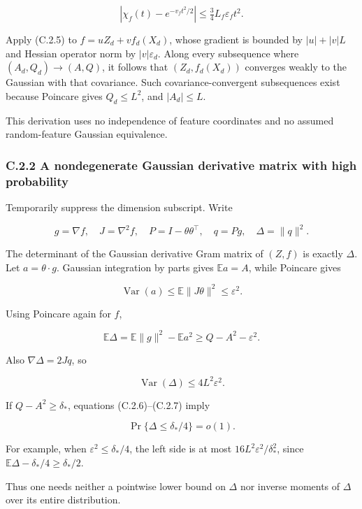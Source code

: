 \documentclass[
  11pt,
  a4paper,
]{article}
\begin{document}
\[
|\chi_f(t)-e^{-v_ft^2/2}|
 \le\tfrac34 L_f\varepsilon_f t^2.
\tag{C.2.5}
\]

Apply (C.2.5) to \(f=uZ_d+v f_d(X_d)\), whose gradient is bounded by
\(|u|+|v|L\) and Hessian operator norm by \(|v|\varepsilon_d\). Along
every subsequence where \((A_d,Q_d)\to(A,Q)\), it follows that
\((Z_d,f_d(X_d))\) converges weakly to the Gaussian with that
covariance. Such covariance-convergent subsequences exist because
Poincare gives \(Q_d\le L^2\), and \(|A_d|\le L\).

This derivation uses no independence of feature coordinates and no
assumed random-feature Gaussian equivalence.

\hypertarget{c.2.2-a-nondegenerate-gaussian-derivative-matrix-with-high-probability}{%
\subsubsection{C.2.2 A nondegenerate Gaussian derivative matrix with
high
probability}\label{c.2.2-a-nondegenerate-gaussian-derivative-matrix-with-high-probability}}

Temporarily suppress the dimension subscript. Write

\[
g=\nabla f,\quad J=\nabla^2f,\quad
P=I-\theta\theta^\top,\quad q=Pg,\quad
\Delta=\|q\|^2.
\]

The determinant of the Gaussian derivative Gram matrix of \((Z,f)\) is
exactly \(\Delta\). Let \(a=\theta\cdot g\). Gaussian integration by
parts gives \(\mathbb Ea=A\), while Poincare gives

\[
\operatorname{Var}(a)\le\mathbb E\|J\theta\|^2
 \le\varepsilon^2.
\]

Using Poincare again for \(f\),

\[
\mathbb E\Delta
 =\mathbb E\|g\|^2-\mathbb Ea^2
 \ge Q-A^2-\varepsilon^2.
\tag{C.2.6}
\]

Also \(\nabla\Delta=2Jq\), so

\[
\operatorname{Var}(\Delta)
 \le 4L^2\varepsilon^2.
\tag{C.2.7}
\]

If \(Q-A^2\ge\delta_*\), equations (C.2.6)--(C.2.7) imply

\[
\Pr\{\Delta\le\delta_*/4\}=o(1).
\tag{C.2.8}
\]

For example, when \(\varepsilon^2\le\delta_*/4\), the left side is at
most \(16L^2\varepsilon^2/\delta_*^2\), since
\(\mathbb E\Delta-\delta_*/4\ge\delta_*/2\).

Thus one needs neither a pointwise lower bound on \(\Delta\) nor inverse
moments of \(\Delta\) over its entire distribution.
\end{document}
